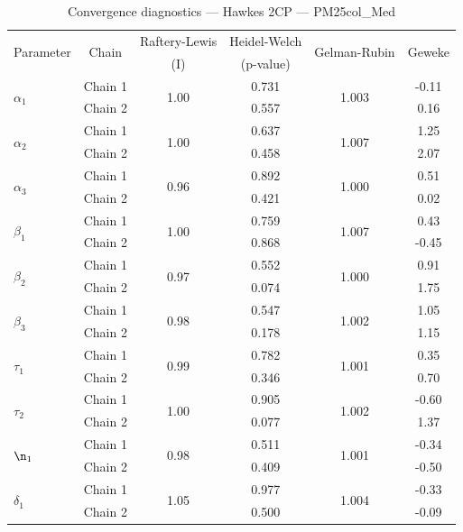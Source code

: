 \begin{table}[H]
\centering
\caption{Convergence diagnostics — Hawkes 2CP — PM25col_Med}
\begin{tabular}{lccccc}
\toprule
\multirow{2}{*}{Parameter} & \multirow{2}{*}{Chain} & Raftery-Lewis & Heidel-Welch & \multirow{2}{*}{Gelman-Rubin} & \multirow{2}{*}{Geweke} \\
 & & (I) & (p-value) & & (z) \\
\midrule
\multirow{2}{*}{$\alpha_1$} & Chain 1 & \multirow{2}{*}{1.00} & 0.731 & \multirow{2}{*}{1.003} & -0.11 \\
 & Chain 2 & & 0.557 & & 0.16 \\
\multirow{2}{*}{$\alpha_2$} & Chain 1 & \multirow{2}{*}{1.00} & 0.637 & \multirow{2}{*}{1.007} & 1.25 \\
 & Chain 2 & & 0.458 & & 2.07 \\
\multirow{2}{*}{$\alpha_3$} & Chain 1 & \multirow{2}{*}{0.96} & 0.892 & \multirow{2}{*}{1.000} & 0.51 \\
 & Chain 2 & & 0.421 & & 0.02 \\
\midrule
\multirow{2}{*}{$\beta_1$} & Chain 1 & \multirow{2}{*}{1.00} & 0.759 & \multirow{2}{*}{1.007} & 0.43 \\
 & Chain 2 & & 0.868 & & -0.45 \\
\multirow{2}{*}{$\beta_2$} & Chain 1 & \multirow{2}{*}{0.97} & 0.552 & \multirow{2}{*}{1.000} & 0.91 \\
 & Chain 2 & & 0.074 & & 1.75 \\
\multirow{2}{*}{$\beta_3$} & Chain 1 & \multirow{2}{*}{0.98} & 0.547 & \multirow{2}{*}{1.002} & 1.05 \\
 & Chain 2 & & 0.178 & & 1.15 \\
\midrule
\multirow{2}{*}{$\tau_1$} & Chain 1 & \multirow{2}{*}{0.99} & 0.782 & \multirow{2}{*}{1.001} & 0.35 \\
 & Chain 2 & & 0.346 & & 0.70 \\
\multirow{2}{*}{$\tau_2$} & Chain 1 & \multirow{2}{*}{1.00} & 0.905 & \multirow{2}{*}{1.002} & -0.60 \\
 & Chain 2 & & 0.077 & & 1.37 \\
\midrule
\multirow{2}{*}{$\n_1$} & Chain 1 & \multirow{2}{*}{0.98} & 0.511 & \multirow{2}{*}{1.001} & -0.34 \\
 & Chain 2 & & 0.409 & & -0.50 \\
\midrule
\multirow{2}{*}{$\delta_1$} & Chain 1 & \multirow{2}{*}{1.05} & 0.977 & \multirow{2}{*}{1.004} & -0.33 \\
 & Chain 2 & & 0.500 & & -0.09 \\
\bottomrule
\end{tabular}
\end{table}
